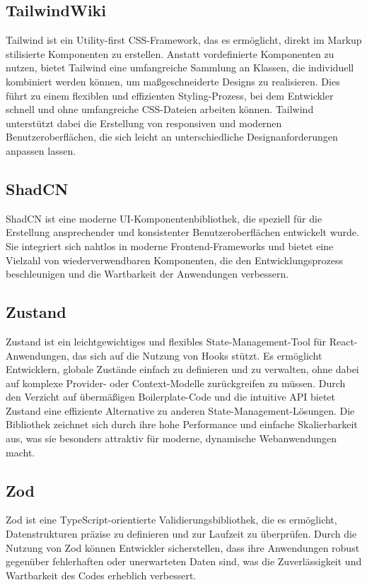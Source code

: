 \begin{inhalt}
\subsection{TailwindWiki}
Tailwind \cite{TailwindWiki} ist ein Utility-first CSS-Framework, das es ermöglicht, direkt im Markup stilisierte Komponenten zu erstellen. Anstatt vordefinierte Komponenten zu nutzen, bietet Tailwind eine umfangreiche Sammlung an Klassen, die individuell kombiniert werden können, um maßgeschneiderte Designs zu realisieren. Dies führt zu einem flexiblen und effizienten Styling-Prozess, bei dem Entwickler schnell und ohne umfangreiche CSS-Dateien arbeiten können. Tailwind unterstützt dabei die Erstellung von responsiven und modernen Benutzeroberflächen, die sich leicht an unterschiedliche Designanforderungen anpassen lassen.

\subsection{ShadCN}
ShadCN \cite{ShadCN} ist eine moderne UI-Komponentenbibliothek, die speziell für die Erstellung ansprechender und konsistenter Benutzeroberflächen entwickelt wurde. Sie integriert sich nahtlos in moderne Frontend-Frameworks und bietet eine Vielzahl von wiederverwendbaren Komponenten, die den Entwicklungsprozess beschleunigen und die Wartbarkeit der Anwendungen verbessern.


\subsection{Zustand} \label{subsec:Zustand} 
Zustand \cite{Zustand} ist ein leichtgewichtiges und flexibles State-Management-Tool für React-Anwendungen, das sich auf die Nutzung von Hooks stützt. Es ermöglicht Entwicklern, globale Zustände einfach zu definieren und zu verwalten, ohne dabei auf komplexe Provider- oder Context-Modelle zurückgreifen zu müssen. Durch den Verzicht auf übermäßigen Boilerplate-Code und die intuitive API bietet Zustand eine effiziente Alternative zu anderen State-Management-Lösungen. Die Bibliothek zeichnet sich durch ihre hohe Performance und einfache Skalierbarkeit aus, was sie besonders attraktiv für moderne, dynamische Webanwendungen macht.

\subsection{Zod}
\label{subsec:Zod}
Zod \cite{Zod} ist eine TypeScript-orientierte Validierungsbibliothek, die es ermöglicht, Datenstrukturen präzise zu definieren und zur Laufzeit zu überprüfen. Durch die Nutzung von Zod können Entwickler sicherstellen, dass ihre Anwendungen robust gegenüber fehlerhaften oder unerwarteten Daten sind, was die Zuverlässigkeit und Wartbarkeit des Codes erheblich verbessert.


\end{inhalt}
